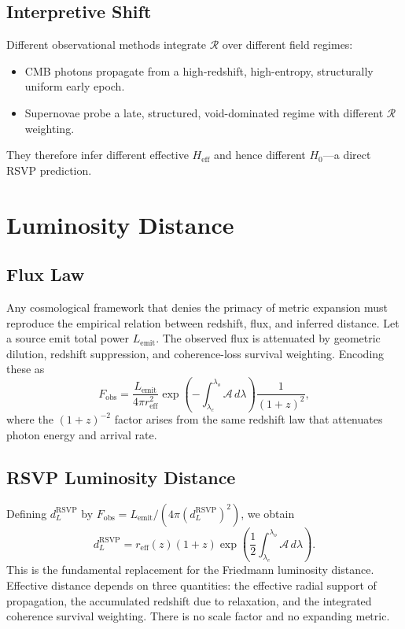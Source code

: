 \documentclass[12pt,a4paper]{article}
\theoremstyle{remark}
\newcommand{\Rcal}{\mathcal{R}}
\newcommand{\Acal}{\mathcal{A}}
\newcommand{\reff}{r_{\mathrm{eff}}}
\newcommand{\dL}{d_L^{\mathrm{RSVP}}}
\newcommand{\Heff}{H_{\mathrm{eff}}}
\begin{document}
\subsection{Interpretive Shift}

Different observational methods integrate $\Rcal$ over different field regimes:
\begin{itemize}[leftmargin=2em]
\item CMB photons propagate from a high-redshift, high-entropy, structurally uniform early epoch.
\item Supernovae probe a late, structured, void-dominated regime with different $\Rcal$ weighting.
\end{itemize}
They therefore infer different effective $\Heff$ and hence different $H_0$---a direct RSVP prediction.

\section{Luminosity Distance}
\label{sec:luminosity}

\subsection{Flux Law}

Any cosmological framework that denies the primacy of metric expansion must reproduce the empirical relation between redshift, flux, and inferred distance. Let a source emit total power $L_{\mathrm{emit}}$. The observed flux is attenuated by geometric dilution, redshift suppression, and coherence-loss survival weighting. Encoding these as
\begin{equation}
F_{\mathrm{obs}} = \frac{L_{\mathrm{emit}}}{4\pi \reff^2} \exp\!\left(-\int_{\lambda_e}^{\lambda_o} \Acal\, d\lambda\right) \frac{1}{(1+z)^2},
\label{eq:flux}
\end{equation}
where the $(1+z)^{-2}$ factor arises from the same redshift law that attenuates photon energy and arrival rate.

\subsection{RSVP Luminosity Distance}

Defining $\dL$ by $F_{\mathrm{obs}} = L_{\mathrm{emit}} / (4\pi (\dL)^2)$, we obtain
\begin{equation}
\boxed{\dL = \reff(z)(1+z) \exp\!\left(\frac{1}{2}\int_{\lambda_e}^{\lambda_o} \Acal\, d\lambda\right).}
\label{eq:dL}
\end{equation}
This is the fundamental replacement for the Friedmann luminosity distance. Effective distance depends on three quantities: the effective radial support of propagation, the accumulated redshift due to relaxation, and the integrated coherence survival weighting. There is no scale factor and no expanding metric.
\end{document}
